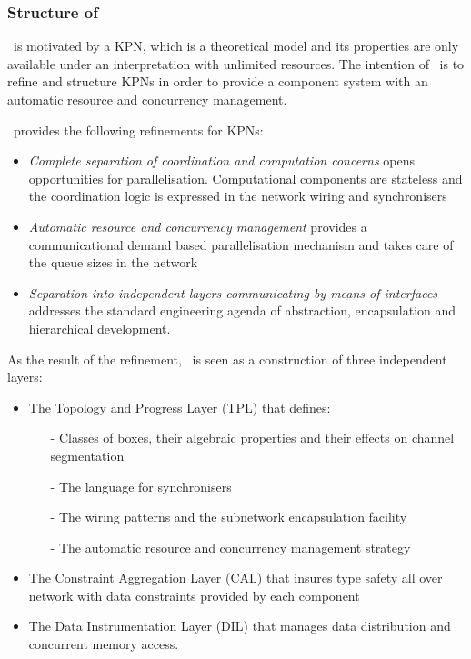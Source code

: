     \subsubsection{Structure of \ak\ }
\ak\ is motivated by a KPN, which is a theoretical model and its properties are only available under an interpretation with unlimited resources. The intention of \ak\ is to refine and structure KPNs in order to provide a component system with an automatic resource and concurrency management.

\ak\ provides the following refinements for KPNs:
\begin{itemize}
\item \emph{Complete separation of coordination and computation concerns} opens opportunities for parallelisation. Computational components are stateless and the coordination logic is expressed in the network wiring and synchronisers

\item \emph{Automatic resource and concurrency management} provides a communicational demand based parallelisation mechanism and takes care of the queue sizes in the network

\item \emph{Separation into independent layers communicating by means of interfaces} addresses the standard engineering agenda of abstraction, encapsulation and hierarchical development.
\end{itemize}

As the result of the refinement, \ak\ is seen as a construction of three independent layers:
\begin{itemize}
\item The Topology and Progress Layer (TPL) that defines:
    \begin{itemize}
\item[-] Classes of boxes, their algebraic properties and their effects on channel segmentation
\item[-] The language for synchronisers
\item[-] The wiring patterns and the subnetwork encapsulation facility
\item[-] The automatic resource and concurrency management strategy
    \end{itemize}

\item The Constraint Aggregation Layer (CAL) that insures type safety all over network with data constraints provided by each component

\item The Data Instrumentation Layer (DIL) that manages data distribution and concurrent memory access.
\end{itemize}


